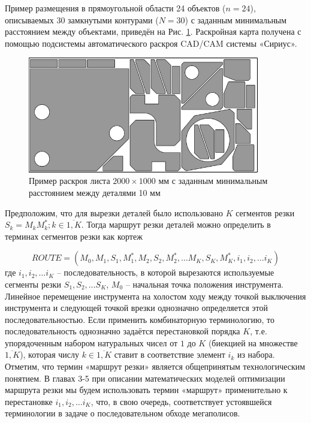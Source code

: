\documentclass[12pt]{report}
\begin{document}
Пример размещения в прямоугольной области 24 объектов
($n=24$),
описываемых 30 замкнутыми контурами
($N=30$)
с заданным минимальным расстоянием между объектами,
приведён на Рис. \ref{nesting}.
Раскройная карта получена с
помощью подсистемы автоматического раскроя CAD/CAM системы «Сириус».

\begin{figure}
  \begin{center}
  \includegraphics[width=0.9\textwidth]{nesting.png}
  \caption{Пример раскроя листа $2000 \times 1000$ мм с заданным минимальным расстоянием между деталями 10 мм}
  \label{nesting}
  \end{center}
\end{figure}

Предположим, что для вырезки деталей было использовано
$K$
сегментов резки
$S_k=M_kM^*_k; k \in \overline{1,K}$.
Тогда маршрут резки деталей можно определить
в терминах сегментов резки как кортеж

\begin{equation}
  ROUTE = (
    M_0, M_1, S_1, M_1^*, M_2, S_2, M_2^*, \dots M_K, S_K, M_K^*, i_1, i_2, \dots i_K
  )
  \label{tuple}
\end{equation}
где
$i_1, i_2, \dots i_K$
– последовательность, в которой вырезаются используемые сегменты резки
$S_1, S_2, \dots S_K$,
$M_0$
– начальная точка положения инструмента.
Линейное перемещение инструмента на холостом ходу
между точкой выключения инструмента и следующей точкой врезки
однозначно определяется этой последовательностью.
Если применить комбинаторную терминологию,
то последовательность однозначно задаётся перестановкой порядка
$K$,
т.е. упорядоченным набором натуральных чисел от $1$ до $K$
(биекцией на множестве $\overline{1,K}$),
которая числу
$k \in \overline{1,K}$
ставит в соответствие элемент
$i_k$ из набора.
Отметим, что термин «маршрут резки» является
общепринятым технологическим понятием.
В главах 3-5 при описании математических моделей оптимизации
маршрута резки мы будем использовать термин «маршрут»
применительно к перестановке
$i_1, i_2, \dots i_K$,
что, в свою очередь, соответствует устоявшейся
терминологии в задаче о последовательном обходе мегаполисов.
\end{document}
